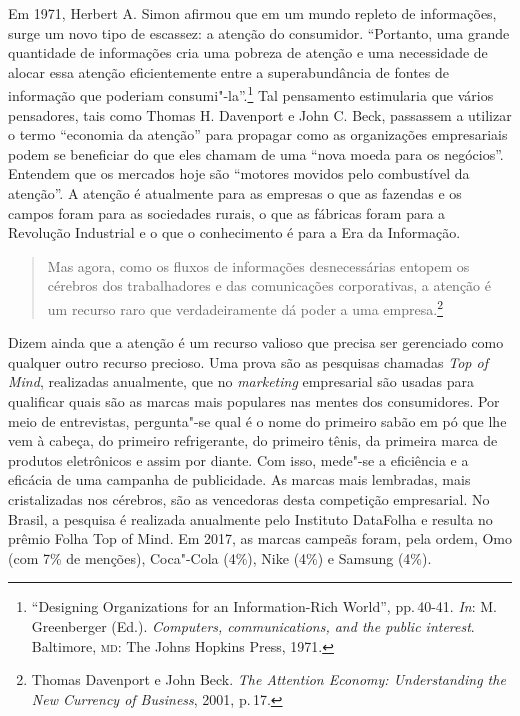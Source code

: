 Em 1971, Herbert A. Simon afirmou que em um mundo repleto de
informações, surge um novo tipo de escassez: a atenção do consumidor.
``Portanto, uma grande quantidade de informações cria uma pobreza de
atenção e uma necessidade de alocar essa atenção eficientemente entre a
superabundância de fontes de informação que poderiam consumi"-la''.\footnote{``Designing Organizations for an Information-Rich World'', pp.\,40-41. \emph{In}: M. Greenberger (Ed.). \textit{Computers, communications, and the public interest}. Baltimore, \textsc{md}: The Johns Hopkins Press, 1971.} Tal pensamento estimularia que vários pensadores,
tais como Thomas H. Davenport e John C. Beck, passassem a utilizar o
termo ``economia da atenção'' para propagar como as organizações
empresariais podem se beneficiar do que eles chamam de uma ``nova moeda
para os negócios''. Entendem que os mercados hoje são ``motores movidos
pelo combustível da atenção''. A atenção é atualmente para as empresas o
que as fazendas e os campos foram para as sociedades rurais, o que as
fábricas foram para a Revolução Industrial e o que o conhecimento é para
a Era da Informação.

\begin{quote}
Mas agora, como os fluxos de informações desnecessárias entopem os
cérebros dos trabalhadores e das comunicações corporativas, a atenção é
um recurso raro que verdadeiramente dá poder a uma empresa.\footnote{Thomas Davenport e John Beck. \emph{The Attention Economy:
Understanding the New Currency of Business}, 2001, p.\,17.}
\end{quote}

Dizem ainda que a atenção é um recurso valioso que precisa ser
gerenciado como qualquer outro recurso precioso. Uma prova são as
pesquisas chamadas \emph{Top of Mind}, realizadas anualmente, que no
\emph{marketing} empresarial são usadas para qualificar quais são as
marcas mais populares nas mentes dos consumidores. Por meio de
entrevistas, pergunta"-se qual é o nome do primeiro sabão em pó que lhe
vem à cabeça, do primeiro refrigerante, do primeiro tênis, da primeira
marca de produtos eletrônicos e assim por diante. Com isso, mede"-se a
eficiência e a eficácia de uma campanha de publicidade. As marcas mais
lembradas, mais cristalizadas nos cérebros, são as vencedoras desta
competição empresarial. No Brasil, a pesquisa é realizada anualmente
pelo Instituto DataFolha e resulta no prêmio Folha Top of Mind. Em 2017,
as marcas campeãs foram, pela ordem, Omo (com 7\% de menções), Coca"-Cola
(4\%), Nike (4\%) e Samsung (4\%).

